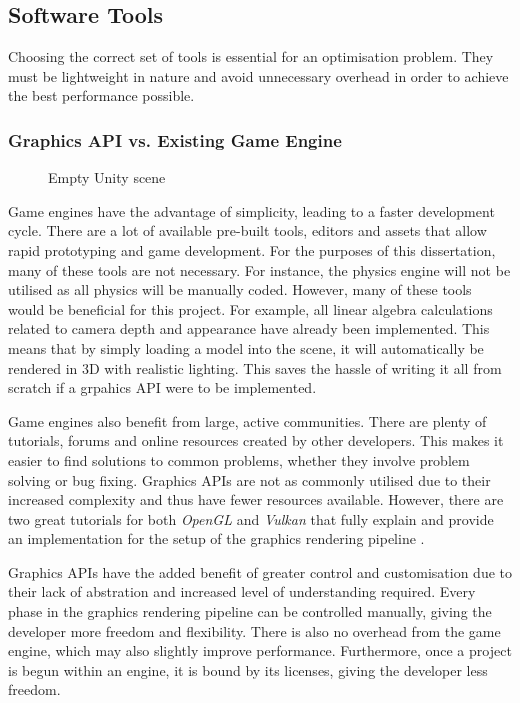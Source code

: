 \documentclass[12pt]{article}
\newcommand{\wideimage}[2][]{%
  \makebox[\textwidth][c]{\texttt{[image: \#2]}}%
}
\begin{document}
    \subsection{Software Tools}

    Choosing the correct set of tools is essential for an optimisation problem. They must be lightweight in nature and avoid unnecessary overhead in order to achieve the best performance possible.

    \subsubsection{Graphics API vs. Existing Game Engine}

    \begin{figure}[H]
        \wideimage[]{unityInterface.png}
        \caption{Empty Unity\cite{unity} scene}
    \end{figure}

    Game engines have the advantage of simplicity, leading to a faster development cycle. There are a lot of available pre-built tools, editors and assets that allow rapid prototyping and game development. For the purposes of this dissertation, many of these tools are not necessary. For instance, the physics engine will not be utilised as all physics will be manually coded. However, many of these tools would be beneficial for this project. For example, all linear algebra calculations related to camera depth and appearance have already been implemented. This means that by simply loading a model into the scene, it will automatically be rendered in 3D with realistic lighting. This saves the hassle of writing it all from scratch if a grpahics API were to be implemented.

    Game engines also benefit from large, active communities. There are plenty of tutorials, forums and online resources created by other developers. This makes it easier to find solutions to common problems, whether they involve problem solving or bug fixing. Graphics APIs are not as commonly utilised due to their increased complexity and thus have fewer resources available. However, there are two great tutorials for both \textit{OpenGL} and \textit{Vulkan}\cite{vulkan} that fully explain and provide an implementation for the setup of the graphics rendering pipeline \cite{learnopengl}\cite{vulkantutorial}.

    Graphics APIs have the added benefit of greater control and customisation due to their lack of abstration and increased level of understanding required. Every phase in the graphics rendering pipeline can be controlled manually, giving the developer more freedom and flexibility. There is also no overhead from the game engine, which may also slightly improve performance. Furthermore, once a project is begun within an engine, it is bound by its licenses, giving the developer less freedom.
\end{document}
